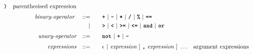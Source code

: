 \begin{alignat*}{9}
                                            \textbf{\texttt{)}} && \textrm{parenthesised expression}\\[1mm]
&& \textit{binary-operator}    \ 
                        && ::= &\quad && \textbf{\texttt{+}}\ |\ \textbf{\texttt{-}}\ |\ \textbf{\texttt{*}}\ |\ \textbf{\texttt{/}}\ |\ \textbf{\texttt{\%}}\ |\ 
                                   \textbf{\texttt{==}}\ \\ %
&&                       && |  &\quad &&  \texttt{\textbf{>}}\ |\ \texttt{\textbf{<}}\ |\ \texttt{\textbf{>=}}\ |\ \texttt{\textbf{<=}}\
                                          |\ \textbf{\texttt{and}}\ |\ \texttt{\textbf{or}}\  \\[1mm]
&& \textit{unary-operator}    
                        && ::= &\quad && \textbf{\texttt{not}}\ |\ \textbf{\texttt{+}}\ |\ \textbf{\texttt{-}} \\[1mm]
&& \textit{expressions}  && ::= &\quad && \epsilon\ | \ \textit{expression}\ [
                                                               \ \textbf{\texttt{,}} \
                                                                 \textit{expression} \ 
                                                                      ]\ \ldots
                                                            && \textrm{argument expressions}
\end{alignat*}

\newpage